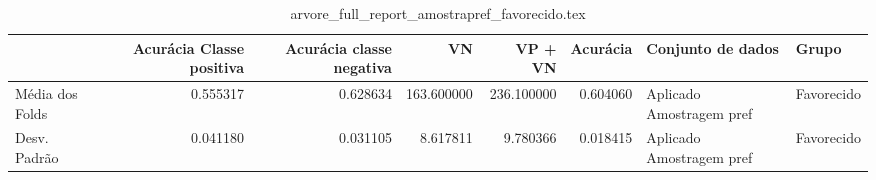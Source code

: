 \begin{table}
\centering
\caption{arvore_full_report_amostrapref_favorecido.tex}
\label{arvore_full_report_amostrapref_favorecido.tex}
\begin{tabular}{lrrrrrll}
\toprule
{}              &  Acurácia Classe positiva &  Acurácia classe negativa &         VN  &    VP + VN  &  Acurácia &         Conjunto de dados &       Grupo \\
\midrule
Média dos Folds &                  0.555317 &                  0.628634 &  163.600000 &  236.100000 &  0.604060 &  Aplicado Amostragem pref &  Favorecido \\
Desv. Padrão    &                  0.041180 &                  0.031105 &    8.617811 &    9.780366 &  0.018415 &  Aplicado Amostragem pref &  Favorecido \\
\bottomrule
\end{tabular}
\end{table}
